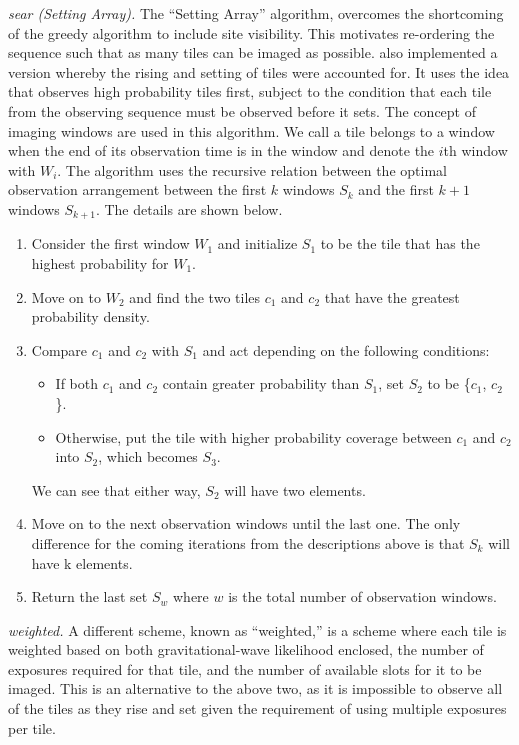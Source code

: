 \documentclass[twocolumn]{aastex62}
\begin{document}
\emph{sear (Setting Array).} The ``Setting Array'' algorithm, overcomes the shortcoming of the greedy algorithm to include site visibility. This motivates re-ordering the sequence such that as many tiles can be imaged as possible.
\cite{RaSi2017} also implemented a version whereby the rising and setting of tiles were accounted for. It uses the idea that observes high probability tiles first, subject to the condition that each tile from the observing sequence must be observed before it sets. The concept of imaging windows are used in this algorithm. We call a tile belongs to a window when the end of its observation time is in the window and denote the $i$th window with $W_i$. The algorithm uses the recursive relation between the optimal observation arrangement between the first $k$ windows $S_k$ and the first $k + 1$ windows $S_{k+1}$. The details are shown below. 
\begin{enumerate}
\item Consider the first window $W_1$ and initialize $S_1$ to be the tile that has the highest probability for $W_1$.
\item Move on to $W_2$ and find the two tiles $c_1$ and $c_2$ that have the greatest probability density.
\item Compare $c_1$ and $c_2$ with $S_1$ and act depending on the following conditions:
\begin{itemize}
\item If both $c_1$ and $c_2$ contain greater probability than $S_1$, set $S_2$ to be \{$c_1$, $c_2$\}.
\item Otherwise, put the tile with higher probability coverage between $c_1$ and $c_2$ into $S_2$, which becomes $S_3$.
\end{itemize}
We can see that either way, $S_2$ will have two elements.
\item Move on to the next observation windows until the last one. The only difference for the coming iterations from the descriptions above is that $S_k$ will have k elements.
\item Return the last set $S_w$ where $w$ is the total number of observation windows.
\end{enumerate}

\emph{weighted.} A different scheme, known as ``weighted,'' is a scheme where each tile is weighted based on both gravitational-wave likelihood enclosed, the number of exposures required for that tile, and the number of available slots for it to be imaged. This is an alternative to the above two, as it is impossible to observe all of the tiles as they rise and set given the requirement of using multiple exposures per tile. 
\end{document}
